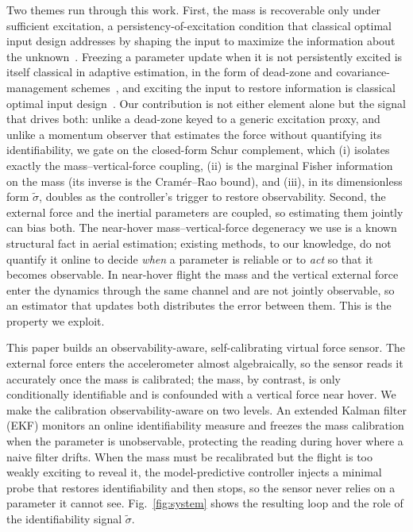 \documentclass[lettersize,journal]{IEEEtran}
\begin{document}
Two themes run through this work. First, the mass is recoverable only under
sufficient excitation, a persistency-of-excitation condition that classical
optimal input design addresses by shaping the input to maximize the information
about the unknown~\cite{mehra1974optimal}. Freezing a parameter update when it is
not persistently excited is itself classical in adaptive estimation, in the form
of dead-zone and covariance-management schemes~\cite{smeur2016adaptive}, and
exciting the input to restore information is classical optimal input
design~\cite{mehra1974optimal}. Our contribution is not either element alone
but the signal that drives both: unlike a dead-zone keyed to a generic
excitation proxy, and unlike a momentum observer that estimates the force without
quantifying its identifiability, we gate on the closed-form Schur complement, which
(i) isolates exactly the mass--vertical-force coupling, (ii) is the marginal Fisher
information on the mass (its inverse is the Cram\'er--Rao bound), and (iii), in its
dimensionless form $\tilde\sigma$, doubles as the
controller's trigger to restore observability.
Second, the external force and the inertial parameters are coupled, so estimating
them jointly can bias both. The near-hover mass--vertical-force degeneracy we use
is a known structural fact in aerial estimation; existing methods, to our
knowledge, do not quantify it online to decide \emph{when} a parameter is
reliable or to \emph{act} so that it becomes observable. In near-hover flight
the mass and the vertical external force enter the dynamics through the same
channel and are not jointly observable, so an estimator that updates both
distributes the error between them. This is the property we exploit.

This paper builds an observability-aware, self-calibrating virtual force sensor.
The external force enters the accelerometer almost algebraically, so the sensor
reads it accurately once the mass is calibrated; the mass, by contrast, is only
conditionally identifiable and is confounded with a vertical force near hover. We
make the calibration observability-aware on two levels. An extended Kalman filter
(EKF) monitors an online identifiability measure and freezes the mass calibration
when the parameter is unobservable, protecting the reading during hover where a
naive filter drifts. When the mass must be recalibrated but the flight is too
weakly exciting to reveal it, the model-predictive controller injects a minimal probe that
restores identifiability and then stops, so the sensor never relies on a parameter
it cannot see. Fig.~\ref{fig:system} shows the resulting loop and the role of the
identifiability signal $\tilde\sigma$.
\end{document}
